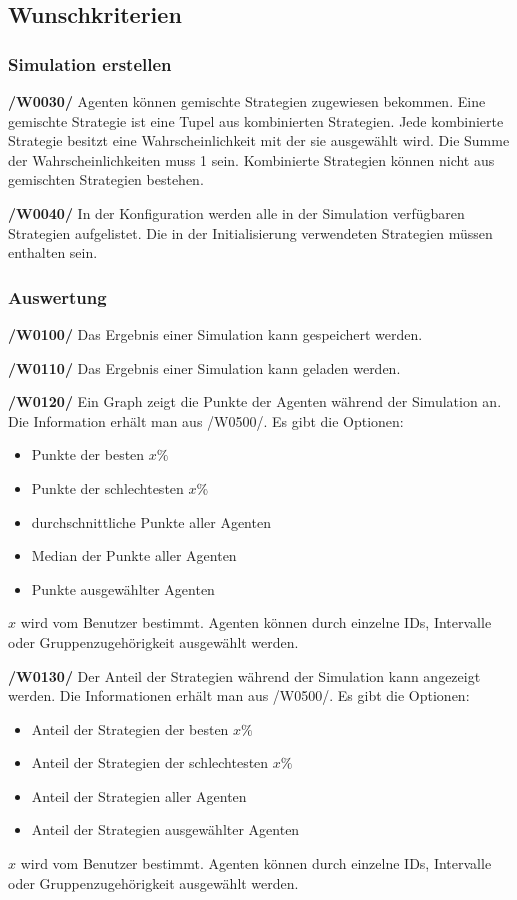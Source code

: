 \subsection{Wunschkriterien}

\subsubsection{Simulation erstellen}

\textbf{/W0030/}
Agenten können gemischte Strategien zugewiesen bekommen. {\color{red} Eine gemischte Strategie ist eine Tupel  aus kombinierten Strategien. Jede kombinierte Strategie besitzt eine Wahrscheinlichkeit mit der sie ausgewählt wird. Die Summe der Wahrscheinlichkeiten muss 1 sein. Kombinierte Strategien können nicht aus gemischten Strategien bestehen.}

\textbf{/W0040/}
In der Konfiguration werden alle in der Simulation verfügbaren Strategien aufgelistet. Die in der Initialisierung verwendeten Strategien müssen enthalten sein.

\subsubsection{Auswertung}

\textbf{/W0100/}
Das Ergebnis einer Simulation kann gespeichert werden.

\textbf{/W0110/}
Das Ergebnis einer Simulation kann geladen werden.

\textbf{/W0120/}
Ein Graph zeigt die Punkte der Agenten während der Simulation an. Die Information erhält man aus /W0500/. Es gibt die Optionen:
\begin{itemize}
\item Punkte der besten $x\%$
\item Punkte der schlechtesten $x\%$
\item durchschnittliche Punkte aller Agenten
\item Median der Punkte aller Agenten
\item Punkte ausgewählter Agenten
\end{itemize}
$x$ wird vom Benutzer bestimmt. Agenten können durch einzelne IDs, Intervalle oder Gruppenzugehörigkeit ausgewählt werden. 

\textbf{/W0130/}
Der Anteil der Strategien während der Simulation kann angezeigt werden. Die Informationen erhält man aus /W0500/. Es gibt die Optionen:
\begin{itemize}
\item Anteil der Strategien der besten $x\%$
\item Anteil der Strategien der schlechtesten $x\%$
\item Anteil der Strategien aller Agenten
\item Anteil der Strategien ausgewählter Agenten
\end{itemize}
$x$ wird vom Benutzer bestimmt. Agenten können durch einzelne IDs, Intervalle  oder Gruppenzugehörigkeit ausgewählt werden. 

